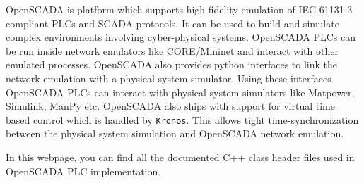 Open\+S\+C\+A\+DA is platform which supports high fidelity emulation of I\+EC 61131-\/3 compliant P\+L\+Cs and S\+C\+A\+DA protocols. It can be used to build and simulate complex environments involving cyber-\/physical systems. Open\+S\+C\+A\+DA P\+L\+Cs can be run inside network emulators like C\+O\+R\+E/\+Mininet and interact with other emulated processes. Open\+S\+C\+A\+DA also provides python interfaces to link the network emulation with a physical system simulator. Using these interfaces Open\+S\+C\+A\+DA P\+L\+Cs can interact with physical system simulators like Matpower, Simulink, Man\+Py etc. Open\+S\+C\+A\+DA also ships with support for virtual time based control which is handled by \href{http://www.github.com/Vignesh2208/Kronos}{\tt Kronos}. This allows tight time-\/synchronization between the physical system simulation and Open\+S\+C\+A\+DA network emulation.

In this webpage, you can find all the documented C++ class header files used in Open\+S\+C\+A\+DA P\+LC implementation. 